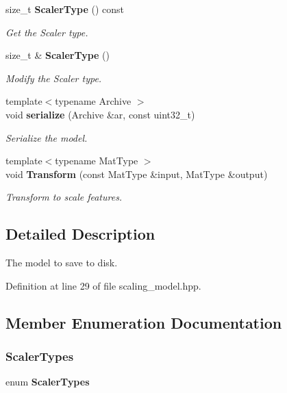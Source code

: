 \begin{DoxyCompactItemize}
size\+\_\+t \textbf{ Scaler\+Type} () const
\begin{DoxyCompactList}\small\item\em Get the Scaler type. \end{DoxyCompactList}\item 
size\+\_\+t \& \textbf{ Scaler\+Type} ()
\begin{DoxyCompactList}\small\item\em Modify the Scaler type. \end{DoxyCompactList}\item 
{\footnotesize template$<$typename Archive $>$ }\\void \textbf{ serialize} (Archive \&ar, const uint32\+\_\+t)
\begin{DoxyCompactList}\small\item\em Serialize the model. \end{DoxyCompactList}\item 
{\footnotesize template$<$typename Mat\+Type $>$ }\\void \textbf{ Transform} (const Mat\+Type \&input, Mat\+Type \&output)
\begin{DoxyCompactList}\small\item\em Transform to scale features. \end{DoxyCompactList}\end{DoxyCompactItemize}


\subsection{Detailed Description}
The model to save to disk. 

Definition at line 29 of file scaling\+\_\+model.\+hpp.



\subsection{Member Enumeration Documentation}
\mbox{\label{classmlpack_1_1data_1_1ScalingModel_abd1f5884bbfcd36c9a457c486948e61a}} 
\subsubsection{Scaler\+Types}
{\footnotesize\ttfamily enum \textbf{ Scaler\+Types}}

